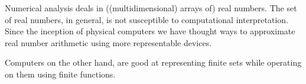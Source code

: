 Numerical analysis deals in ((multidimensional) arrays of) real numbers. The
set of real numbers, in general, is not susceptible to computational
interpretation\cite{turing-1936-7-computability}. Since the inception of
physical computers we have thought ways to approximate real number arithmetic
using more representable devices.

Computers on the other hand, are good at representing finite sets while
operating on them using finite functions.


